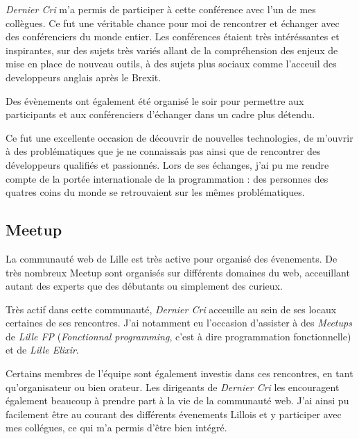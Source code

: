 \documentclass[12pt,a4paper]{article}
\begin{document}
  \emph{Dernier Cri} m'a permis de participer à cette conférence avec l'un
  de mes collègues. Ce fut une véritable chance pour moi de rencontrer et
  échanger avec des conférenciers du monde entier. Les conférences étaient
  très intéréssantes et inspirantes, sur des sujets très variés allant de
  la compréhension des enjeux de mise en place de nouveau outils, à des
  sujets plus sociaux comme l'acceuil des developpeurs anglais après le
  Brexit.

  \bigskip

  Des évènements ont également été organisé le soir pour permettre aux
  participants et aux conférenciers d'échanger dans un cadre plus détendu.

  \bigskip

  Ce fut une excellente occasion de découvrir de nouvelles technologies,
  de m'ouvrir à des problématiques que je ne connaissais pas ainsi que de
  rencontrer des développeurs qualifiés et passionnés. Lors de ses
  échanges, j'ai pu me rendre compte de la portée internationale de la
  programmation : des personnes des quatres coins du monde se retrouvaient
  sur les mêmes problématiques.

  \bigskip

  \subsection{Meetup}\label{meetup}

  \bigskip

  La communauté web de Lille est très active pour organisé des évenements.
  De très nombreux Meetup sont organisés sur différents domaines du web,
  acceuillant autant des experts que des débutants ou simplement des
  curieux.

  \bigskip

  Très actif dans cette communauté, \emph{Dernier Cri} acceuille au sein
  de ses locaux certaines de ses rencontres. J'ai notamment eu l'occasion
  d'assister à des \emph{Meetups} de \emph{Lille FP} (\emph{Fonctionnal
  programming}, c'est à dire programmation fonctionnelle) et de
  \emph{Lille Elixir}.

  \bigskip

  Certains membres de l'équipe sont également investis dans ces
  rencontres, en tant qu'organisateur ou bien orateur. Les dirigeants de
  \emph{Dernier Cri} les encouragent également beaucoup à prendre part à
  la vie de la communauté web. J'ai ainsi pu facilement être au courant
  des différents évenements Lillois et y participer avec mes collégues, ce
  qui m'a permis d'être bien intégré.
\end{document}
